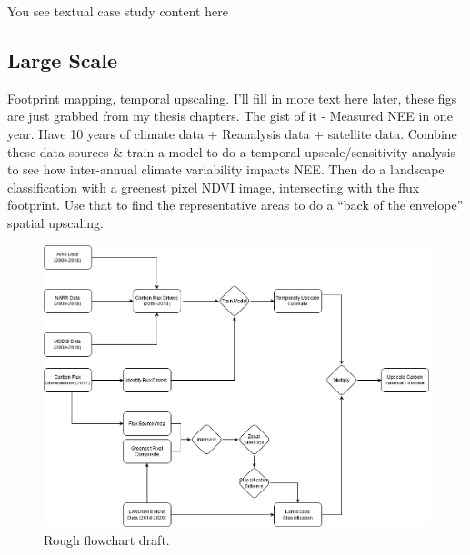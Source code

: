 \documentclass[
]{book}
\begin{document}
You see textual case study content here

\hypertarget{large-scale}{%
\subsection{Large Scale}\label{large-scale}}

Footprint mapping, temporal upscaling. I'll fill in more text here later, these figs are just grabbed from my thesis chapters. The gist of it - Measured NEE in one year. Have 10 years of climate data + Reanalysis data + satellite data. Combine these data sources \& train a model to do a temporal upscale/sensitivity analysis to see how inter-annual climate variability impacts NEE. Then do a landscape classification with a greenest pixel NDVI image, intersecting with the flux footprint. Use that to find the representative areas to do a ``back of the envelope'' spatial upscaling.

\begin{figure}
\includegraphics[width=1\linewidth]{images/16-flux-upscaling-estimate} \caption{Rough flowchart draft.}\label{fig:16-16-flux-upscaling-estimate}
\end{figure}
\end{document}
